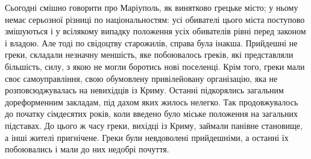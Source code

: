 \documentclass[a4paper,20pt]{report}
\begin{document}
Сьогодні смішно говорити про Маріуполь, як винятково грецьке місто; у ньому
немає серьозної різниці по національностям: усі обивателі цього міста поступово
змішуються і у всілякому випадку положення усіх обивателів рівні перед законом
і владою. Але тоді по свідоцтву старожилів, справа була інакша. Прийдешні не
греки, складали незначну меншість, яке побоювалось греків, які представляли
більшість, силу, з якою не могли боротись нові поселенці. Крім того, греки мали
своє самоуправління, свою обумовлену привілейовану організацію, яка не
розповсюджувалась на невихідців із Криму. Останні підкорялись загальним
дореформенним закладам, під дахом яких жилось нелегко. Так продовжувалось до
початку сімдесятих років, коли введено було міське положення на загальних
підставах. До цього ж часу греки, вихідці із Криму, займали панівне становище, а інші
жителі пригнічене. Греки були невдоволені прийдешніми, а останні їх побоювались і мали до них недобрі 
почуття.
\end{document}
